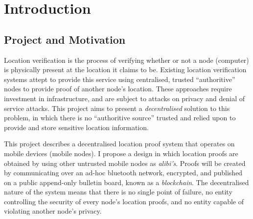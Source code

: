 \section{Introduction}
\subsection{Project and Motivation}
Location verification is the process of verifying whether or not a  node (computer) is physically present at the location it claims to be. Existing location verification systems attept to provide this service using centralised, trusted ``authoritive'' nodes to provide proof of another node's location. These approaches require investment in infrastructure, and are subject to attacks on privacy and denial of service attacks. This project aims to present a \textit{decentralised} solution to this problem, in which there is no ``authoritive source'' trusted and relied upon to provide and store sensitive location information.

This project describes a decentralised location proof system that operates on mobile devices (mobile nodes). I propose a design in which location proofs are obtained by using other untrusted mobile nodes as \textit{alibi's}. Proofs will be created by communicating over an ad-hoc bluetooth network, encrypted, and published on a public append-only bulletin board, known as a \textit{blockchain}. The decentralised nature of the system means that there is no single point of failure, no entity controlling the security of every node's location proofs, and no entity capable of violating another node's privacy.